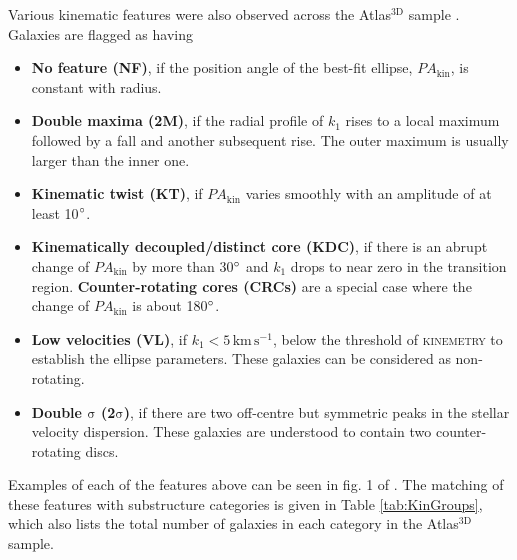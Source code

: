 	Various kinematic features were also observed across the Atlas$^\text{3D}$ sample \citep{Krajnovic2011}. Galaxies are flagged as having
	\begin{itemize}
		\item \textbf{No feature (NF)}, if the position angle of the best-fit ellipse, $PA_\mathrm{kin}$, is constant with radius.
		\item \textbf{Double maxima (2M)}, if the radial profile of $k_1$ rises to a local maximum followed by a fall and another subsequent rise. The outer maximum is usually larger than the inner one. 
		\item \textbf{Kinematic twist (KT)}, if $PA_\mathrm{kin}$ varies smoothly with an amplitude of at least 10$\degree$. 
		\item \textbf{Kinematically decoupled/distinct core (KDC)}, if there is an abrupt change of $PA_\mathrm{kin}$ by more than 30$\degree$ and $k_1$ drops to near zero in the transition region. \textbf{Counter-rotating cores (CRCs)} are a special case where the change of $PA_\mathrm{kin}$ is about 180$\degree$.
		\item \textbf{Low velocities (VL)}, if $k_1 < 5 \, \mathrm{km \, s^{-1}}$, below the threshold of \textsc{kinemetry} to establish the ellipse parameters. These galaxies can be considered as non-rotating.
		\item \textbf{Double $\mathrm{\sigma}$ (2$\mathrm{\sigma}$)}, if there are two off-centre but symmetric peaks in the stellar velocity dispersion. These galaxies are understood to contain two counter-rotating discs. 
	\end{itemize}
	Examples of each of the features above can be seen in fig. 1 of \citet{Krajnovic2011}. The matching of these features with substructure categories is given in Table \ref{tab:KinGroups}, which also lists the total number of galaxies in each category in the Atlas$^\text{3D}$ sample. 

